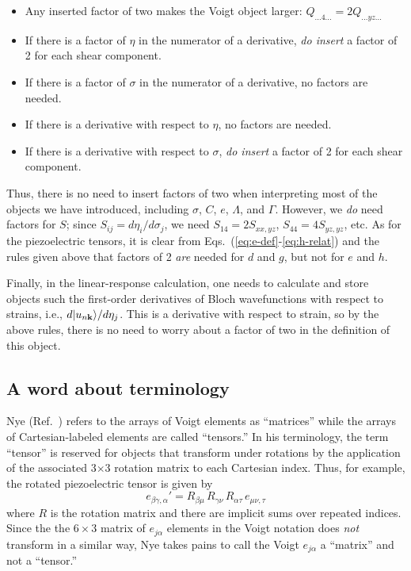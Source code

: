 \documentclass[11pt,fleqn]{article}
\def\beq{\begin{equation}}
\def\eeq{\end{equation}}
\begin{document}
\begin{itemize}

\item
Any inserted factor of two makes the Voigt object larger: $Q_{...4...}=
2Q_{...yz...}$

\item
If there is a factor of $\eta$ in the numerator of a derivative,
{\it do insert} a factor of 2 for each shear component.

\item
If there is a factor of $\sigma$ in the numerator of a derivative,
no factors are needed.

\item
If there is a derivative with respect to $\eta$, no factors are needed.

\item
If there is a derivative with respect to $\sigma$, {\it do insert}
a factor of 2 for each shear component.

\end{itemize}

\noindent
Thus, there is no need to insert factors of two when interpreting
most of the objects we have introduced, including $\sigma$, $C$, $e$,
$\Lambda$, and $\Gamma$.  However, we {\it do} need factors for $S$;
since $S_{ij}=d\eta_i/d\sigma_j$, we need $S_{14}=2S_{xx,yz}$,
$S_{44}=4S_{yz,yz}$, etc.
As for the piezoelectric
tensors, it is clear from Eqs.~(\ref{eq:e-def}-\ref{eq:h-relat})
and the rules given above that factors of 2
{\it are} needed for $d$ and $g$, but not for $e$ and $h$.

Finally, in the linear-response calculation, one needs to calculate
and store objects such the first-order derivatives of Bloch
wavefunctions with respect to strains, i.e., $d\vert u_{n{\bf k}}\rangle
/d\eta_j$.  This is a derivative with respect to strain, so by
the above rules, there is no need to worry about a factor of two
in the definition of this object.

\subsection{A word about terminology}

Nye (Ref.~\cite{nye}) refers to the arrays of Voigt elements as
``matrices'' while the arrays of Cartesian-labeled elements are
called ``tensors.'' In his terminology, the term ``tensor'' is
reserved for objects that transform under rotations by the
application of the associated 3$\times$3 rotation matrix to each
Cartesian index.  Thus, for example, the rotated piezoelectric
tensor is given by
%
\beq
e_{\beta\gamma,\alpha}'= R_{\beta\mu} \, R_{\gamma\nu}\,
R_{\alpha\tau}\,e_{\mu\nu,\tau}
\eeq
%
where $R$ is the rotation matrix and there are implicit sums over
repeated indices.  Since the the $6\times3$ matrix
of $e_{j\alpha}$ elements in the Voigt notation does {\it not}
transform in a similar way, Nye takes pains to call the
Voigt $e_{j\alpha}$ a ``matrix'' and not a ``tensor.''
\end{document}
